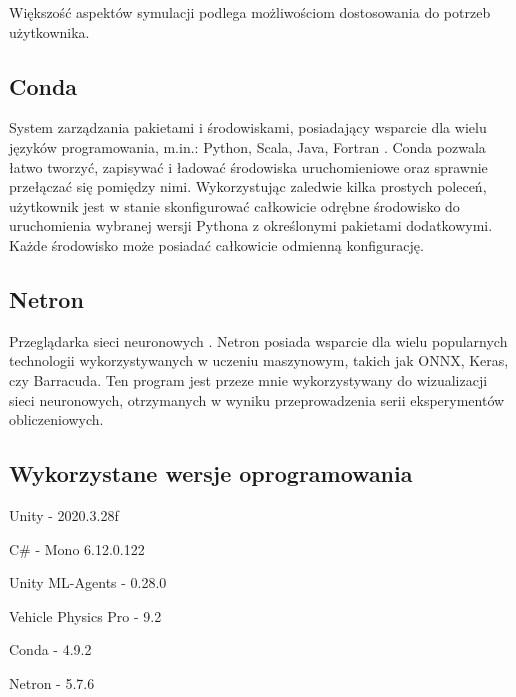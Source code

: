Większość aspektów symulacji podlega możliwościom dostosowania do potrzeb użytkownika.

\subsection{Conda}
System zarządzania pakietami i środowiskami, posiadający wsparcie dla wielu języków programowania, m.in.: Python, Scala, Java, Fortran \cite{conda:overview}. Conda pozwala łatwo tworzyć, zapisywać i ładować środowiska uruchomieniowe oraz sprawnie przełączać się pomiędzy nimi. Wykorzystując zaledwie kilka prostych poleceń, użytkownik jest w stanie skonfigurować całkowicie odrębne środowisko do uruchomienia wybranej wersji Pythona z określonymi pakietami dodatkowymi. Każde środowisko może posiadać całkowicie odmienną konfigurację.

\subsection{Netron}
Przeglądarka sieci neuronowych \cite{netron:github}. Netron posiada wsparcie dla wielu popularnych technologii wykorzystywanych w uczeniu maszynowym, takich jak ONNX, Keras, czy Barracuda. Ten program jest przeze mnie wykorzystywany do wizualizacji sieci neuronowych, otrzymanych w wyniku przeprowadzenia serii eksperymentów obliczeniowych.

\subsection{Wykorzystane wersje oprogramowania}
\begin{enumerate*}
\item Unity - 2020.3.28f
\item C\# - Mono 6.12.0.122
\item Unity ML-Agents - 0.28.0
\item Vehicle Physics Pro - 9.2
\item Conda - 4.9.2
\item Netron - 5.7.6
\end{enumerate*}
